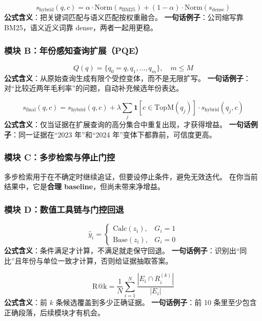 \documentclass[UTF8,a4paper,12pt]{ctexart}
\begin{document}
\begin{equation}
s_{\text{hybrid}}(q,c)=\alpha\cdot \text{Norm}(s_{\text{BM25}})+(1-\alpha)\cdot \text{Norm}(s_{\text{dense}})
\end{equation}
\textbf{公式含义}：把关键词匹配与语义匹配按权重融合。  
\textbf{一句话例子}：公司缩写靠 BM25，语义近义词靠 dense，两者一起用更稳。

\subsubsection*{模块 B：年份感知查询扩展（PQE）}
\begin{equation}
Q(q)=\{q_0=q,q_1,\ldots,q_m\},\quad m\le M
\end{equation}
\textbf{公式含义}：从原始查询生成有限个受控变体，而不是无限扩写。  
\textbf{一句话例子}：对“比较近两年毛利率”的问题，自动补充候选年份表达。

\begin{equation}
s_{\text{final}}(q,c)=s_{\text{hybrid}}(q,c)+\lambda \sum_j \mathbf{1}[c\in \text{TopM}(q_j)]\cdot s_{\text{hybrid}}(q_j,c)
\end{equation}
\textbf{公式含义}：仅当证据在扩展查询的高分集合中重复出现，才获得增益。  
\textbf{一句话例子}：同一证据在“2023 年”和“2024 年”变体下都靠前，可信度更高。

\subsubsection*{模块 C：多步检索与停止门控}
多步检索用于在不确定时继续追证，但要设停止条件，避免无效迭代。
在你当前结果中，它是\textbf{合理 baseline}，但尚未带来净增益。

\subsubsection*{模块 D：数值工具链与门控回退}
\begin{equation}
\hat{y}_i=
\begin{cases}
\text{Calc}(z_i), & G_i=1\\
\text{Base}(z_i), & G_i=0
\end{cases}
\end{equation}
\textbf{公式含义}：条件满足才计算，不满足就走保守回退。  
\textbf{一句话例子}：识别出“同比”且年份与单位一致才计算，否则给证据抽取答案。

\begin{equation}
\text{R@k}=\frac{1}{N}\sum_{i=1}^{N}\frac{|E_i\cap R_i^{(k)}|}{|E_i|}
\end{equation}
\textbf{公式含义}：前 $k$ 条候选覆盖到多少正确证据。  
\textbf{一句话例子}：前 10 条里至少包含正确段落，后续模块才有机会。
\end{document}
